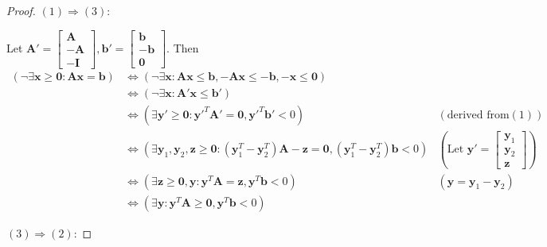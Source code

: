     \begin{proof}
        $(1)\Rightarrow(3)$:

        Let $\mathbf{A}'=\left[
        \begin{matrix}
            \mathbf{A} \\
            -\mathbf{A} \\
            -\mathbf{I}
        \end{matrix}
        \right],
        \mathbf{b}'=\left[
        \begin{matrix}
            \mathbf{b} \\
            -\mathbf{b} \\
            \mathbf{0}
        \end{matrix}
        \right]$.
        Then \begin{align*}
            (\neg \exists \mathbf{x}\ge \mathbf{0}: \mathbf{A}\mathbf{x}= \mathbf{b})&\iff(\neg \exists \mathbf{x}: \mathbf{A}\mathbf{x}\le \mathbf{b},-\mathbf{A}\mathbf{x}\le-\mathbf{b},-\mathbf{x}\le \mathbf{0})\\
                                        &\iff(\neg \exists \mathbf{x}: \mathbf{A}'\mathbf{x}\le \mathbf{b}') \\
                                        &\iff(\exists \mathbf{y}'\ge \mathbf{0} :\mathbf{y}'^{T}\mathbf{A}'=\mathbf{0},\mathbf{y}'^{T}\mathbf{b}'<0) &(\text{derived from} (1))\\
                                        &\iff(\exists \mathbf{y}_1,\mathbf{y}_2,\mathbf{z}\ge \mathbf{0}:(\mathbf{y}_{1}^{T}-\mathbf{y}_{2}^{T})\mathbf{A}-\mathbf{z}=\mathbf{0},(\mathbf{y}_{1}^{T}-\mathbf{y}_{2}^{T})\mathbf{b}<0) &(\text{Let }\mathbf{y}'=\left[\begin{matrix} \mathbf{y}_1 \\\mathbf{y}_2 \\\mathbf{z} \end{matrix}\right])\\
                                        &\iff(\exists \mathbf{z}\ge \mathbf{0}, \mathbf{y}:\mathbf{y}^{T}\mathbf{A}=\mathbf{z},\mathbf{y}^{T}\mathbf{b}<0) &(\mathbf{y}=\mathbf{y}_1-\mathbf{y}_2) \\
                                        &\iff(\exists \mathbf{y} :\mathbf{y}^{T}\mathbf{A}\ge \mathbf{0},\mathbf{y}^{T}\mathbf{b}<0)
        \end{align*}

        $(3)\Rightarrow(2)$:


\end{proof}
